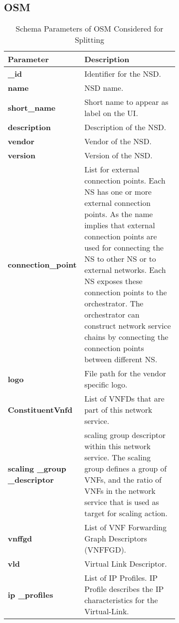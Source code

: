 \subsection{OSM}
\label{osplitter}
\begin{table}[htbp] \cite{OSMSchemaDocumentation}
	\begin{center}
		\caption{Schema Parameters of OSM Considered for Splitting}
		\label{tab:table2}
			\begin{tabular}{|l|p{0.7\linewidth}|}
			\textbf{Parameter} & \textbf{Description} \\
			\hline
			\textbf{\_id} & Identifier for the NSD. \\ 
			\textbf{name} & NSD name. \\
			\textbf{short\_name} & Short name to appear as label on the UI. \\
			\textbf{description} & Description of the NSD. \\
			\textbf{vendor} & Vendor of the NSD. \\
			\textbf{version} & Version of the NSD. \\
			\textbf{connection\_point} & List for external connection points.
Each NS has one or more external connection
points. As the name implies that external
connection points are used for connecting
the NS to other NS or to external networks.
Each NS exposes these connection points to
the orchestrator. The orchestrator can
construct network service chains by
connecting the connection points between
different NS. \\
			\textbf{logo} & File path for the vendor specific logo. \\
			\textbf{ConstituentVnfd} & List of VNFDs that are part of this
network service. \\
			\textbf{scaling \_group \_descriptor} & scaling group descriptor within this network service.
The scaling group defines a group of VNFs,
and the ratio of VNFs in the network service
that is used as target for scaling action. \\
			\textbf{vnffgd} & List of VNF Forwarding Graph Descriptors (VNFFGD). \\
			\textbf{vld} & Virtual Link Descriptor. \\
			\textbf{ip \_profiles} & List of IP Profiles.
  IP Profile describes the IP characteristics for the Virtual-Link. \\
		\end{tabular}
	\end{center}
\end{table}
